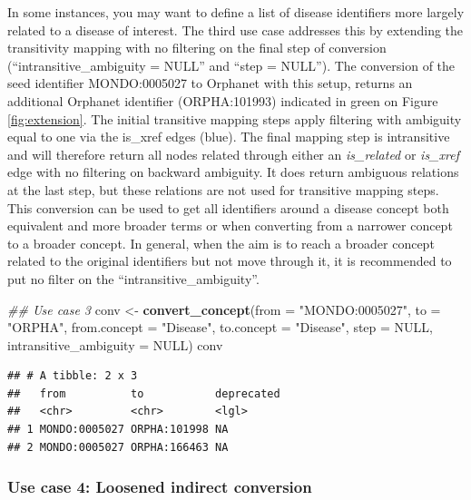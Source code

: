 \documentclass[9pt,a4paper,]{extarticle}
\newenvironment{Shaded}{\begin{snugshade}}{\end{snugshade}}
\newcommand{\CommentTok}[1]{\textcolor[rgb]{0.56,0.35,0.01}{\textit{#1}}}
\newcommand{\DataTypeTok}[1]{\textcolor[rgb]{0.13,0.29,0.53}{#1}}
\newcommand{\KeywordTok}[1]{\textcolor[rgb]{0.13,0.29,0.53}{\textbf{#1}}}
\newcommand{\NormalTok}[1]{#1}
\newcommand{\OtherTok}[1]{\textcolor[rgb]{0.56,0.35,0.01}{#1}}
\newcommand{\StringTok}[1]{\textcolor[rgb]{0.31,0.60,0.02}{#1}}
\begin{document}
In some instances, you may want to define a list of disease identifiers more largely related to a disease of interest. The third use case addresses this by extending the transitivity mapping with no filtering on the final step of conversion (``intransitive\_ambiguity = NULL'' and ``step = NULL''). The conversion of the seed identifier MONDO:0005027 to Orphanet with this setup, returns an additional Orphanet identifier (ORPHA:101993) indicated in green on Figure \ref{fig:extension}. The initial transitive mapping steps apply filtering with ambiguity equal to one via the is\_xref edges (blue). The final mapping step is intransitive and will therefore return all nodes related through either an \emph{is\_related} or \emph{is\_xref} edge with no filtering on backward ambiguity. It does return ambiguous relations at the last step, but these relations are not used for transitive mapping steps. This conversion can be used to get all identifiers around a disease concept both equivalent and more broader terms or when converting from a narrower concept to a broader concept. In general, when the aim is to reach a broader concept related to the original identifiers but not move through it, it is recommended to put no filter on the ``intransitive\_ambiguity''.

\begin{Shaded}
\begin{Highlighting}[]
\CommentTok{## Use case 3}
\NormalTok{conv <-}\StringTok{ }\KeywordTok{convert_concept}\NormalTok{(}\DataTypeTok{from =} \StringTok{"MONDO:0005027"}\NormalTok{,}
                        \DataTypeTok{to =} \StringTok{"ORPHA"}\NormalTok{,}
                        \DataTypeTok{from.concept =} \StringTok{"Disease"}\NormalTok{,}
                        \DataTypeTok{to.concept =} \StringTok{"Disease"}\NormalTok{,}
                        \DataTypeTok{step =} \OtherTok{NULL}\NormalTok{,}
                        \DataTypeTok{intransitive_ambiguity =} \OtherTok{NULL}\NormalTok{) }
\NormalTok{conv}
\end{Highlighting}
\end{Shaded}

\begin{verbatim}
## # A tibble: 2 x 3
##   from          to           deprecated
##   <chr>         <chr>        <lgl>     
## 1 MONDO:0005027 ORPHA:101998 NA        
## 2 MONDO:0005027 ORPHA:166463 NA
\end{verbatim}

\hypertarget{use-case-4-loosened-indirect-conversion}{%
\subsubsection{Use case 4: Loosened indirect conversion}\label{use-case-4-loosened-indirect-conversion}}
\end{document}
